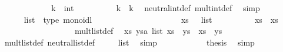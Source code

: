 \begin{isabellebody}
%
\isadelimproof
\ \ \ \ %
\endisadelimproof
%
\isatagproof
{}\isamarkupfalse%
\isanewline
\ \ \ \ \ \ \isamarkupfalse%
\ k\ {\isacharcolon}{\isacharcolon}\ int\isanewline
\ \ \ \ \ \ \isamarkupfalse%
\ {\isachardoublequoteopen}{\isasymone}\ {\isasymotimes}\ k\ {\isacharequal}\ k{\isachardoublequoteclose}\ \isamarkupfalse%
\ neutral{\isacharunderscore}int{\isacharunderscore}def\ mult{\isacharunderscore}int{\isacharunderscore}def\ \isamarkupfalse%
\ simp\isanewline
\ \ \ \ \isamarkupfalse%
%
\endisatagproof
{\isafoldproof}%
%
\isadelimproof
\isanewline
%
\endisadelimproof
\isanewline
\ \ \ \ \isamarkupfalse%
\ list\ {\isacharcolon}{\isacharcolon}\ {\isacharparenleft}type{\isacharparenright}\ monoidl\isanewline
\ \ \ \ \ \ {\isachardoublequoteopen}{\isasymone}\ {\isasymequiv}\ {\isacharbrackleft}{\isacharbrackright}{\isachardoublequoteclose}\isanewline
%
\isadelimproof
\ \ \ \ %
\endisadelimproof
%
\isatagproof
{}\isamarkupfalse%
\isanewline
\ \ \ \ \ \ \isamarkupfalse%
\ xs\ {\isacharcolon}{\isacharcolon}\ {\isachardoublequoteopen}{\isasymalpha}\ list{\isachardoublequoteclose}\isanewline
\ \ \ \ \ \ \isamarkupfalse%
\ {\isachardoublequoteopen}{\isasymone}\ {\isasymotimes}\ xs\ {\isacharequal}\ xs{\isachardoublequoteclose}\isanewline
\ \ \ \ \ \ \isamarkupfalse%
\ {\isacharminus}\isanewline
\ \ \ \ \ \ \ \ \isamarkupfalse%
\ mult{\isacharunderscore}list{\isacharunderscore}def\ \isamarkupfalse%
\ {\isachardoublequoteopen}{\isasymAnd}xs\ ys{\isasymColon}{\isacharprime}a\ list{\isachardot}\ xs\ {\isasymotimes}\ ys\ {\isasymequiv}\ xs\ {\isacharat}\ ys{\isachardoublequoteclose}\ \isacommand{{\isachardot}}\isamarkupfalse%
\isanewline
\ \ \ \ \ \ \ \ \isamarkupfalse%
\ \isamarkupfalse%
\ mult{\isacharunderscore}list{\isacharunderscore}def\ neutral{\isacharunderscore}list{\isacharunderscore}def\ \isamarkupfalse%
\ {\isachardoublequoteopen}{\isasymone}\ {\isasymequiv}\ {\isacharbrackleft}{\isacharbrackright}{\isasymColon}{\isasymalpha}\ list{\isachardoublequoteclose}\ \isamarkupfalse%
\ simp\isanewline
\ \ \ \ \ \ \ \ \isamarkupfalse%
\ \isamarkupfalse%
\ {\isacharquery}thesis\ \isamarkupfalse%
\ simp\isanewline
\ \ \ \ \ \ \isamarkupfalse%
\isanewline
\ \ \ \ \isamarkupfalse%
%
\endisatagproof

\end{isabellebody}
